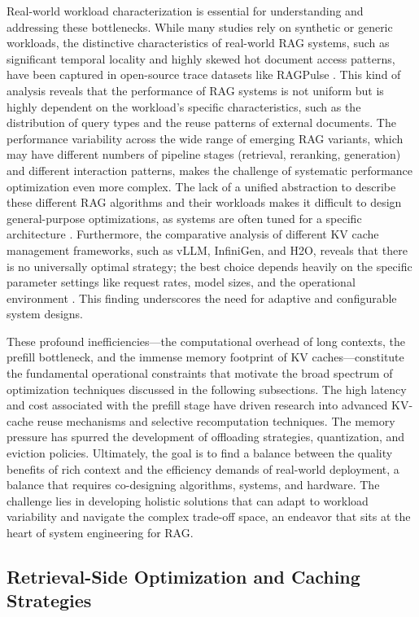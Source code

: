 \documentclass[11pt]{article}
\begin{document}
Real-world workload characterization is essential for understanding and addressing these bottlenecks. While many studies rely on synthetic or generic workloads, the distinctive characteristics of real-world RAG systems, such as significant temporal locality and highly skewed hot document access patterns, have been captured in open-source trace datasets like RAGPulse \cite{ref63}. This kind of analysis reveals that the performance of RAG systems is not uniform but is highly dependent on the workload's specific characteristics, such as the distribution of query types and the reuse patterns of external documents. The performance variability across the wide range of emerging RAG variants, which may have different numbers of pipeline stages (retrieval, reranking, generation) and different interaction patterns, makes the challenge of systematic performance optimization even more complex. The lack of a unified abstraction to describe these different RAG algorithms and their workloads makes it difficult to design general-purpose optimizations, as systems are often tuned for a specific architecture \cite{ref517}. Furthermore, the comparative analysis of different KV cache management frameworks, such as vLLM, InfiniGen, and H2O, reveals that there is no universally optimal strategy; the best choice depends heavily on the specific parameter settings like request rates, model sizes, and the operational environment \cite{ref514}. This finding underscores the need for adaptive and configurable system designs.

These profound inefficiencies---the computational overhead of long contexts, the prefill bottleneck, and the immense memory footprint of KV caches---constitute the fundamental operational constraints that motivate the broad spectrum of optimization techniques discussed in the following subsections. The high latency and cost associated with the prefill stage have driven research into advanced KV-cache reuse mechanisms and selective recomputation techniques. The memory pressure has spurred the development of offloading strategies, quantization, and eviction policies. Ultimately, the goal is to find a balance between the quality benefits of rich context and the efficiency demands of real-world deployment, a balance that requires co-designing algorithms, systems, and hardware. The challenge lies in developing holistic solutions that can adapt to workload variability and navigate the complex trade-off space, an endeavor that sits at the heart of system engineering for RAG.

\subsection{Retrieval-Side Optimization and Caching Strategies}
\end{document}
